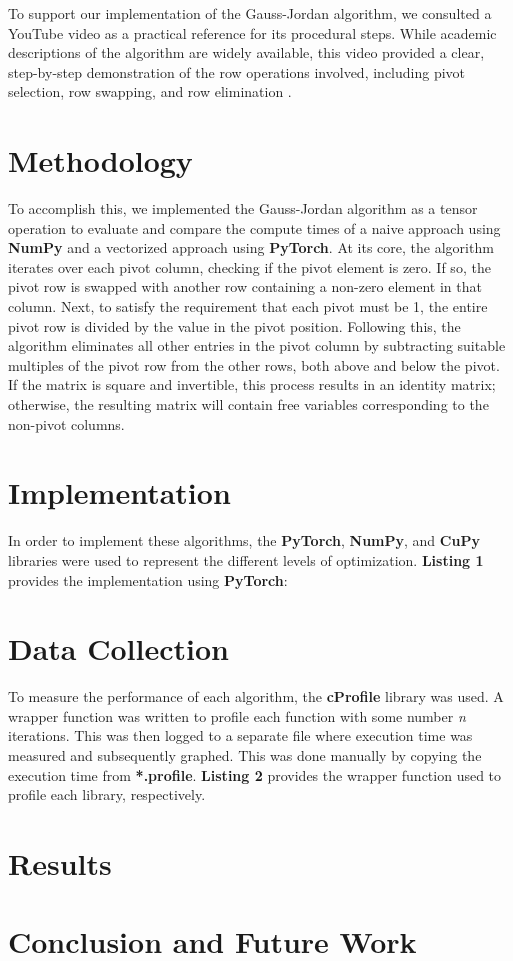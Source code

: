 \documentclass[12pt]{article}
\begin{document}
To support our implementation of the Gauss-Jordan algorithm, we consulted a YouTube video as a practical reference for its procedural steps. While academic descriptions of the algorithm are widely available, this video provided a clear, step-by-step demonstration of the row operations involved, including pivot selection, row swapping, and row elimination \cite{gaussjordan_video}.

\section{Methodology}

To accomplish this, we implemented the Gauss-Jordan algorithm as a tensor operation to evaluate and compare the compute times of a naive approach using \textbf{NumPy} and a vectorized approach using \textbf{PyTorch}. At its core, the algorithm iterates over each pivot column, checking if the pivot element is zero. If so, the pivot row is swapped with another row containing a non-zero element in that column. Next, to satisfy the requirement that each pivot must be 1, the entire pivot row is divided by the value in the pivot position. Following this, the algorithm eliminates all other entries in the pivot column by subtracting suitable multiples of the pivot row from the other rows, both above and below the pivot. If the matrix is square and invertible, this process results in an identity matrix; otherwise, the resulting matrix will contain free variables corresponding to the non-pivot columns.

\section{Implementation}

In order to implement these algorithms, the \textbf{PyTorch}, \textbf{NumPy}, and \textbf{CuPy} libraries were used to represent the different levels of optimization. \textbf{Listing 1} provides the implementation using \textbf{PyTorch}:
\hfill\break

\lstset{style=mystyle}



\section{Data Collection}
To measure the performance of each algorithm, the \textbf{cProfile} library was used. A wrapper function was written to profile each function with some number \textit{n} iterations. This was then logged to a separate file where execution time was measured and subsequently graphed. This was done manually by copying the execution time from \textbf{*.profile}. \textbf{Listing 2} provides the wrapper function used to profile each library, respectively.
\hfill\break



\section{Results}

\section{Conclusion and Future Work}

\newpage


\end{document}
